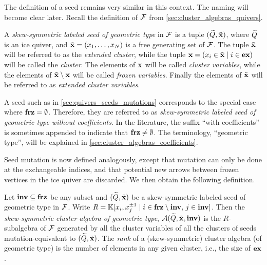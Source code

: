 The definition of a seed remains very similar in this context. The naming will become
clear later. Recall the definition of $\mathcal{F}$ from \cref{sec:cluster_algebras_quivers}.
\begin{definition}

	A \emph{skew-symmetric labeled seed of geometric type} in $\mathcal{F}$ is a tuple $(\widetilde{Q}, \tilde{\mathbf{x}})$, where $\widetilde{Q}$ is an ice quiver, and
	$\tilde{\mathbf{x}} = (x_1, \dots, x_N)$ is a free generating set of $\mathcal{F}$. The tuple $\tilde{\mathbf{x}}$ will be
	referred to as the \emph{extended cluster}, while the tuple
	$\mathbf{x} = (x_i \in \tilde{\mathbf{x}} \mid i \in \mathbf{ex})$ will be called the \emph{cluster}. The elements
	of $\mathbf{x}$ will be called \emph{cluster variables}, while the
	elements of $\tilde{\mathbf{x}} \setminus \mathbf{x}$ will be called \emph{frozen variables}. Finally the
	elements of $\tilde{\mathbf{x}}$ will be referred to as \emph{extended cluster variables}.
\end{definition}

A seed such as in \cref{sec:quivers_seeds_mutations} corresponds to the special case
where $\mathbf{frz} = \emptyset$. Therefore, they are referred to as \emph{skew-symmetric
	labeled seed of geometric type without coefficients}. In the literature, the suffix
``with coefficients'' is sometimes appended to indicate that $\mathbf{frz} \neq \emptyset$. The
terminology, ``geometric type'', will be explained in
\cref{sec:cluster_algebras_coefficients}.

Seed mutation is now defined analogously, except that mutation can only be done at the
exchangeable indices, and that potential new arrows between frozen vertices in the ice
quiver are discarded. We then obtain the following definition.
\begin{definition}\label{def:skew_symmetric_cluster_algebra}

	Let $\mathbf{inv} \subseteq \mathbf{frz}$ be any subset and $(\widetilde{Q}, \tilde{\mathbf{x}})$ be a skew-symmetric labeled
	seed of geometric type in $\mathcal{F}$. Write $R = \mathbb{K}[x_i, x_j^{\pm 1} \mid i \in \mathbf{frz}
		\setminus \mathbf{inv},\, j \in \mathbf{inv}]$. Then the \emph{skew-symmetric cluster algebra of
		geometric type}, $\mathcal{A}(\widetilde{Q},
		\tilde{\mathbf{x}}, \mathbf{inv})$ is the $R$-subalgebra of
	$\mathcal{F}$ generated by all the cluster variables of all the clusters of seeds
	mutation-equivalent to $(\widetilde{Q}, \tilde{\mathbf{x}})$. The \emph{rank} of a (skew-symmetric) cluster algebra (of
	geometric type) is the number of elements in any given cluster, i.e., the size of
	$\mathbf{ex}$.
\end{definition}

